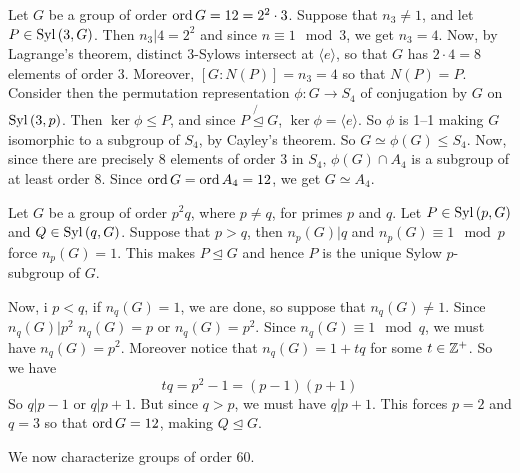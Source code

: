 \begin{example}\label{4.15}
    Let $G$ be a group of order $\operatorname{ord}{G}=12=2^2 \cdot 3$. Suppose that $n_3 \neq
    1$, and let $P \in \operatorname{Syl}{(3,G)}$. Then $n_3|4=2^2$ and since $n \equiv 1
    \mod{3}$, we get $n_3=4$. Now, by Lagrange's theorem, distinct $3$-Sylows
    intersect at  $\langle e \rangle$, so that $G$ has $2 \cdot 4=8$ elements of
    order $3$. Moreover,  $[G:N(P)]=n_3=4$ so that $N(P)=P$. Consider then the
    permutation representation $\phi:G \xrightarrow{} S_4$ of conjugation by $G$
    on  $\operatorname{Syl}{(3,p)}$. Then $\ker{\phi} \leq P$, and since $P \not{\unlhd} G$,
    $\ker{\phi}=\langle e \rangle$. So $\phi$ is 1--1 making $G$ isomorphic to a
    subgroup of $S_4$, by Cayley's theorem. So $G \simeq \phi(G) \leq S_4$. Now,
    since there are precisely $8$ elements of order  $3$ in $S_4$, $\phi(G) \cap
    A_4$ is a subgroup of at least order $8$. Since  $\operatorname{ord}{G}=\operatorname{ord}{A_4}=12$, we
    get $G \simeq A_4$.
\end{example}

\begin{example}\label{4.16}
    Let $G$ be a group of order  $p^2q$, where  $p \neq q$, for primes  $p$ and
     $q$. Let  $P \in \operatorname{Syl}{(p,G)}$ and $Q \in \operatorname{Syl}{(q,G)}$. Suppose that $p>q$,
     then  $n_p(G)|q$ and $n_p(G) \equiv 1 \mod{p}$ force $n_p(G)=1$. This makes
     $P \unlhd G$ and hence $P$ is the unique Sylow $p$-subgroup of $G$.

     Now, i  $p<q$, if $n_q(G)=1$, we are done, so suppose that $n_q(G) \neq 1$.
     Since $n_q(G)|p^2$ $n_q(G)=p$ or $n_q(G)=p^2$. Since  $n_q(G) \equiv 1
     \mod{q}$, we must have $n_q(G)=p^2$. Moreover notice that  $n_q(G)=1+tq$
     for some $t \in \mathbb{Z}^+$. So we have
     \begin{equation*}
         tq=p^2-1=(p-1)(p+1)
     \end{equation*}
     So $q|p-1$ or  $q|p+1$. But since  $q>p$, we must have  $q|p+1$. This
     forces  $p=2$ and  $q=3$ so that  $\operatorname{ord}{G}=12$, making $Q \unlhd G$.
\end{example}

We now characterize groups of order $60$.


